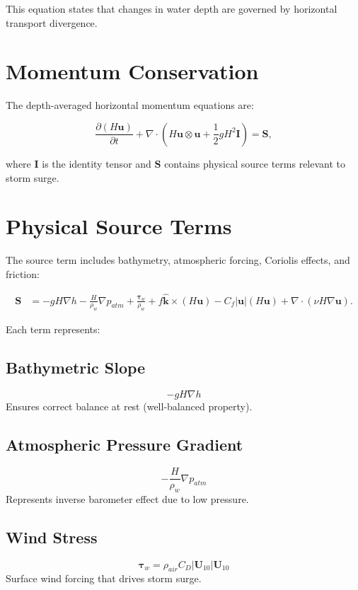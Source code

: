 \documentclass[11pt]{article}
\begin{document}
This equation states that changes in water depth are governed by horizontal transport divergence.

\section{Momentum Conservation}

The depth-averaged horizontal momentum equations are:

\begin{equation}
\frac{\partial (H\bm{u})}{\partial t}
+
\nabla \cdot
\left(
H\bm{u}\otimes\bm{u}
+
\frac{1}{2} g H^2 \bm{I}
\right)
=
\bm{S},
\end{equation}

where $\bm{I}$ is the identity tensor and $\bm{S}$ contains physical source terms relevant to storm surge.

\section{Physical Source Terms}

The source term includes bathymetry, atmospheric forcing, Coriolis effects, and friction:

\begin{align}
\bm{S}
&=
- g H \nabla h
- \frac{H}{\rho_w} \nabla p_{atm}
+ \frac{\bm{\tau}_w}{\rho_w}
+ f \hat{\bm{k}} \times (H\bm{u})
- C_f |\bm{u}| (H\bm{u})
+ \nabla \cdot (\nu H \nabla \bm{u}).
\end{align}

Each term represents:

\subsection*{Bathymetric Slope}
\[
- g H \nabla h
\]
Ensures correct balance at rest (well-balanced property).

\subsection*{Atmospheric Pressure Gradient}
\[
- \frac{H}{\rho_w} \nabla p_{atm}
\]
Represents inverse barometer effect due to low pressure.

\subsection*{Wind Stress}
\[
\bm{\tau}_w = \rho_{air} C_D |\bm{U}_{10}| \bm{U}_{10}
\]
Surface wind forcing that drives storm surge.
\end{document}
